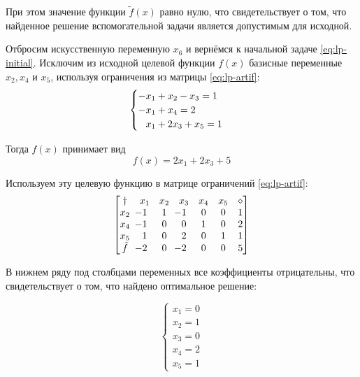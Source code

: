 При этом значение функции $\tilde{f}(x)$ равно нулю, что свидетельствует
о том, что найденное решение вспомогательной задачи является
допустимым для исходной.

Отбросим искусственную переменную $x_6$ и вернёмся к начальной задаче
\eqref{eq:lp-initial}. Исключим из исходной целевой функции $f(x)$
базисные переменные $x_2, x_4$ и $x_5$, используя ограничения из
матрицы \eqref{eq:lp-artif}:
\begin{equation*}
  \begin{cases}
    -x_1+x_2-x_3=1\\
    -x_1+x_4=2\\
    \phm x_1+2x_3+x_5 = 1
  \end{cases}
\end{equation*}

Тогда $f(x)$ принимает вид
\begin{equation*}
  f(x) = 2x_1+2x_3+5
\end{equation*}

Используем эту целевую функцию в матрице ограничений \eqref{eq:lp-artif}:
\begin{equation*}
  \begin{bmatrix}
    \dagger & x_1 & x_2 & x_3 & x_4 & x_5 & \diamond\\
    x_2 &\mm{1}& 1 &\mm{1}& 0 & 0 & 1\\
    x_4 &\mm{1}& 0 &  0 & 1 & 0 & 2\\
    x_5 &  1 & 0 &  2 & 0 & 1 & 1\\
    \tilde{f} & \mm{2} & 0 & \mm{2} & 0 & 0 & 5
  \end{bmatrix}
\end{equation*}

В нижнем ряду под столбцами переменных все коэффициенты отрицательны,
что свидетельствует о том, что найдено оптимальное решение:

\begin{equation}
  \begin{cases}
    x_1 = 0\\
    x_2 = 1\\
    x_3 = 0\\
    x_4 = 2\\
    x_5 = 1
  \end{cases}
\end{equation}
